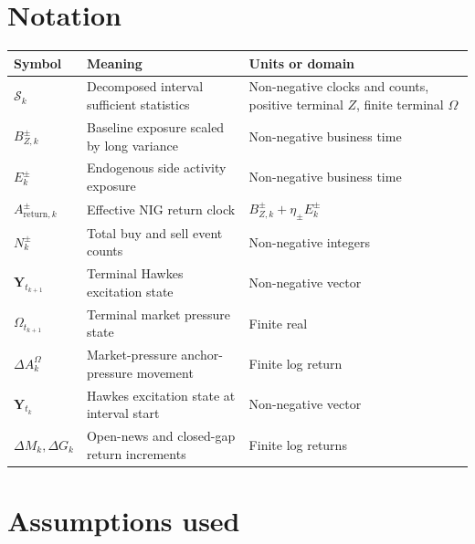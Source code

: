 \documentclass[11pt]{article}
\begin{document}
\section{Notation}

\begin{tabularx}{\textwidth}{lXX}
\toprule
Symbol & Meaning & Units or domain\\
\midrule
\(\mathcal S_k\) & Decomposed interval sufficient statistics & Non-negative clocks and counts, positive terminal \(Z\), finite terminal \(\Omega\)\\
\(B_{Z,k}^\pm\) & Baseline exposure scaled by long variance & Non-negative business time\\
\(E_k^\pm\) & Endogenous side activity exposure & Non-negative business time\\
\(A_{\mathrm{return},k}^\pm\) & Effective NIG return clock & \(B_{Z,k}^\pm+\eta_\pm E_k^\pm\)\\
\(N_k^\pm\) & Total buy and sell event counts & Non-negative integers\\
\(\mathbf Y_{t_{k+1}}\) & Terminal Hawkes excitation state & Non-negative vector\\
\(\Omega_{t_{k+1}}\) & Terminal market pressure state & Finite real\\
\(\Delta A_k^\Omega\) & Market-pressure anchor-pressure movement & Finite log return\\
\(\mathbf Y_{t_k}\) & Hawkes excitation state at interval start & Non-negative vector\\
\(\Delta M_k,\Delta G_k\) & Open-news and closed-gap return increments & Finite log returns\\
\bottomrule
\end{tabularx}

\section{Assumptions used}
\end{document}
